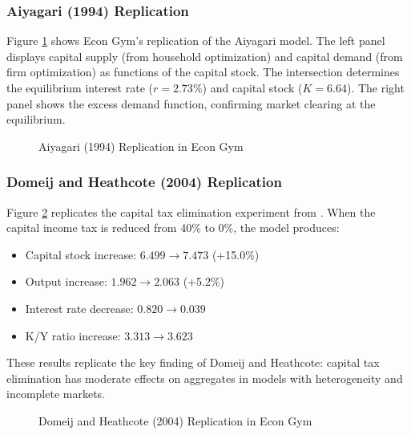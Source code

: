 \documentclass[12pt]{article}
\begin{document}
\subsubsection{Aiyagari (1994) Replication}

Figure \ref{fig:aiyagari} shows Econ Gym's replication of the Aiyagari model. The left panel displays capital supply (from household optimization) and capital demand (from firm optimization) as functions of the capital stock. The intersection determines the equilibrium interest rate ($r = 2.73\%$) and capital stock ($K = 6.64$). The right panel shows the excess demand function, confirming market clearing at the equilibrium.

\begin{figure}[H]
\centering
{}
\caption{Aiyagari (1994) Replication in Econ Gym}
\label{fig:aiyagari}
\end{figure}

\subsubsection{Domeij and Heathcote (2004) Replication}

Figure \ref{fig:dh2004} replicates the capital tax elimination experiment from \citet{domeij2004fiscal}. When the capital income tax is reduced from 40\% to 0\%, the model produces:
\begin{itemize}
    \item Capital stock increase: $6.499 \to 7.473$ (+15.0\%)
    \item Output increase: $1.962 \to 2.063$ (+5.2\%)
    \item Interest rate decrease: $0.820 \to 0.039$
    \item K/Y ratio increase: $3.313 \to 3.623$
\end{itemize}

These results replicate the key finding of Domeij and Heathcote: capital tax elimination has moderate effects on aggregates in models with heterogeneity and incomplete markets.

\begin{figure}[H]
\centering
{}
\caption{Domeij and Heathcote (2004) Replication in Econ Gym}
\label{fig:dh2004}
\end{figure}
\end{document}

